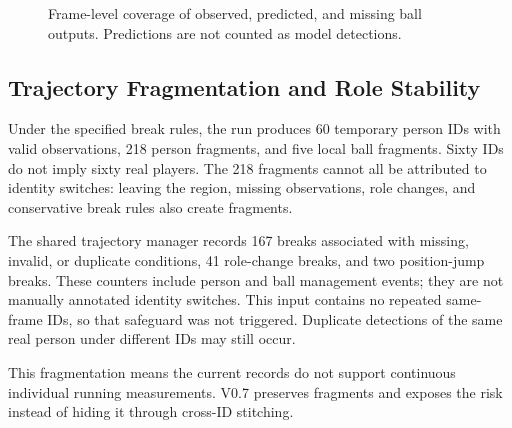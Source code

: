 \documentclass[11pt,a4paper]{article}
\begin{document}
\begin{figure}[htbp]
\centering
{}
\caption{Frame-level coverage of observed, predicted, and missing ball outputs.
Predictions are not counted as model detections.}
\end{figure}

\subsection{Trajectory Fragmentation and Role Stability}

Under the specified break rules, the run produces 60 temporary person IDs
with valid observations, 218 person fragments, and five local ball fragments.
Sixty IDs do not imply sixty real players.
The 218 fragments cannot all be attributed to identity switches: leaving
the region, missing observations, role changes, and conservative break rules
also create fragments.

The shared trajectory manager records 167 breaks associated with missing,
invalid, or duplicate conditions, 41 role-change breaks, and two position-jump
breaks. These counters include person and ball management events; they are
not manually annotated identity switches.
This input contains no repeated same-frame IDs, so that safeguard was not
triggered. Duplicate detections of the same real person under different IDs
may still occur.

This fragmentation means the current records do not support continuous
individual running measurements. V0.7 preserves fragments and exposes the
risk instead of hiding it through cross-ID stitching.
\end{document}
